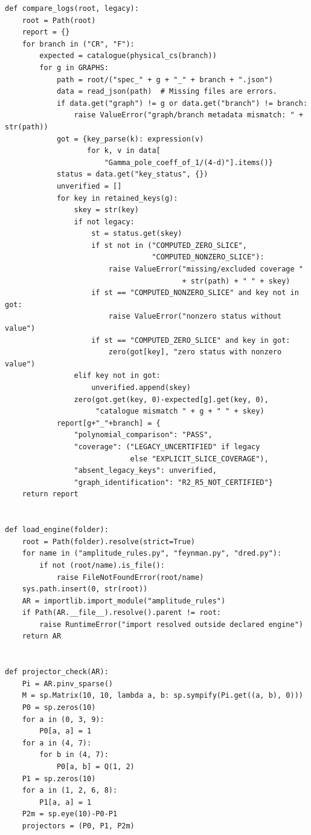 \documentclass[11pt,a4paper]{article}
\theoremstyle{plain}
\theoremstyle{definition}
\theoremstyle{remark}
\numberwithin{equation}{section}
\begin{document}
\begin{lstlisting}[caption={Consolidated exact checker and coverage-aware optional replay.},
                  label={lst:program}]
def compare_logs(root, legacy):
    root = Path(root)
    report = {}
    for branch in ("CR", "F"):
        expected = catalogue(physical_cs(branch))
        for g in GRAPHS:
            path = root/("spec_" + g + "_" + branch + ".json")
            data = read_json(path)  # Missing files are errors.
            if data.get("graph") != g or data.get("branch") != branch:
                raise ValueError("graph/branch metadata mismatch: " + str(path))
            got = {key_parse(k): expression(v)
                   for k, v in data[
                       "Gamma_pole_coeff_of_1/(4-d)"].items()}
            status = data.get("key_status", {})
            unverified = []
            for key in retained_keys(g):
                skey = str(key)
                if not legacy:
                    st = status.get(skey)
                    if st not in ("COMPUTED_ZERO_SLICE",
                                  "COMPUTED_NONZERO_SLICE"):
                        raise ValueError("missing/excluded coverage "
                                         + str(path) + " " + skey)
                    if st == "COMPUTED_NONZERO_SLICE" and key not in got:
                        raise ValueError("nonzero status without value")
                    if st == "COMPUTED_ZERO_SLICE" and key in got:
                        zero(got[key], "zero status with nonzero value")
                elif key not in got:
                    unverified.append(skey)
                zero(got.get(key, 0)-expected[g].get(key, 0),
                     "catalogue mismatch " + g + " " + skey)
            report[g+"_"+branch] = {
                "polynomial_comparison": "PASS",
                "coverage": ("LEGACY_UNCERTIFIED" if legacy
                             else "EXPLICIT_SLICE_COVERAGE"),
                "absent_legacy_keys": unverified,
                "graph_identification": "R2_R5_NOT_CERTIFIED"}
    return report


def load_engine(folder):
    root = Path(folder).resolve(strict=True)
    for name in ("amplitude_rules.py", "feynman.py", "dred.py"):
        if not (root/name).is_file():
            raise FileNotFoundError(root/name)
    sys.path.insert(0, str(root))
    AR = importlib.import_module("amplitude_rules")
    if Path(AR.__file__).resolve().parent != root:
        raise RuntimeError("import resolved outside declared engine")
    return AR


def projector_check(AR):
    Pi = AR.pinv_sparse()
    M = sp.Matrix(10, 10, lambda a, b: sp.sympify(Pi.get((a, b), 0)))
    P0 = sp.zeros(10)
    for a in (0, 3, 9):
        P0[a, a] = 1
    for a in (4, 7):
        for b in (4, 7):
            P0[a, b] = Q(1, 2)
    P1 = sp.zeros(10)
    for a in (1, 2, 6, 8):
        P1[a, a] = 1
    P2m = sp.eye(10)-P0-P1
    projectors = (P0, P1, P2m)


\end{lstlisting}
\end{document}
